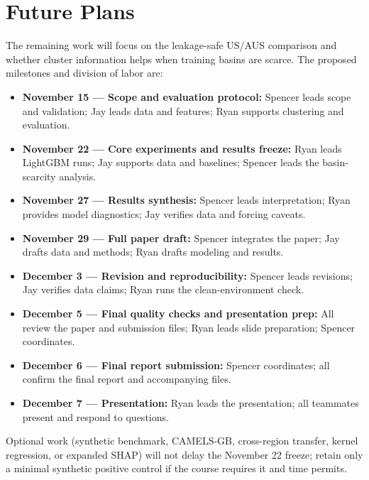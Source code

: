 \section{Future Plans}\label{future-plans}

The remaining work will focus on the leakage-safe US/AUS comparison and
whether cluster information helps when training basins are scarce. The
proposed milestones and division of labor are:

\begin{itemize}
\item
  \textbf{November 15 --- Scope and evaluation protocol:} Spencer leads
  scope and validation; Jay leads data and features; Ryan supports
  clustering and evaluation.
\item
  \textbf{November 22 --- Core experiments and results freeze:} Ryan
  leads LightGBM runs; Jay supports data and baselines; Spencer leads
  the basin-scarcity analysis.
\item
  \textbf{November 27 --- Results synthesis:} Spencer leads
  interpretation; Ryan provides model diagnostics; Jay verifies data and
  forcing caveats.
\item
  \textbf{November 29 --- Full paper draft:} Spencer integrates the
  paper; Jay drafts data and methods; Ryan drafts modeling and results.
\item
  \textbf{December 3 --- Revision and reproducibility:} Spencer leads
  revisions; Jay verifies data claims; Ryan runs the clean-environment
  check.
\item
  \textbf{December 5 --- Final quality checks and presentation prep:}
  All review the paper and submission files; Ryan leads slide
  preparation; Spencer coordinates.
\item
  \textbf{December 6 --- Final report submission:} Spencer coordinates;
  all confirm the final report and accompanying files.
\item
  \textbf{December 7 --- Presentation:} Ryan leads the presentation; all
  teammates present and respond to questions.
\end{itemize}

Optional work (synthetic benchmark, CAMELS-GB, cross-region transfer,
kernel regression, or expanded SHAP) will not delay the November 22
freeze; retain only a minimal synthetic positive control if the course
requires it and time permits.
